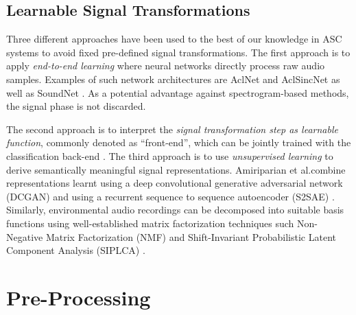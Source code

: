 \documentclass[applsci,article,submit,oneauthor,pdftex]{Definitions/mdpi}
\makeatletter
\newcommand{\etal}{{et al}.\@ }
\makeatother
\begin{document}

\subsection{Learnable Signal Transformations}


Three different approaches have been used to the best of our knowledge in ASC systems to avoid fixed pre-defined signal transformations.
The first approach is to apply \textit{end-to-end learning} where neural networks directly process raw audio samples. Examples of such network architectures are AclNet and AclSincNet \citep{Huang:2019:ASCEnsemble:DCASE} as well as SoundNet \citep{Singh:2019:MultiViewFeatures:DCASE}. As a potential advantage against spectrogram-based methods, the signal phase is not discarded.

The second approach is to interpret the \textit{signal transformation step as learnable function}, commonly denoted as ``front-end'', which can be jointly trained with the classification back-end \citep{Chen:2019:ASCFilters:ICASSP}.
The third approach is to use \textit{unsupervised learning} to derive semantically meaningful signal representations. Amiriparian \etal combine representations learnt using a deep convolutional generative adversarial network (DCGAN) and using a recurrent sequence to sequence autoencoder (S2SAE) \citep{Amiriparian:2018:GANASC:EUSIPCO}. Similarly, environmental audio recordings can be decomposed into suitable basis functions using well-established matrix factorization techniques such Non-Negative Matrix Factorization (NMF) \citep{Bisot:2017:ASC:TASLP} and Shift-Invariant Probabilistic Latent Component Analysis (SIPLCA) \citep{Benetos:2012:ASC:DAFX}.



\section{Pre-Processing}
\label{sec:feature_pre_processing}

\end{document}
